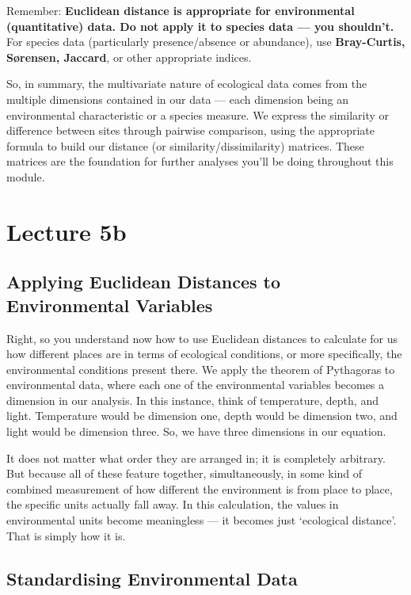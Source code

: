 \documentclass[
  12pt,
]{book}
\begin{document}
Remember: \textbf{Euclidean distance is appropriate for environmental
(quantitative) data. Do not apply it to species data --- you shouldn't.}
For species data (particularly presence/absence or abundance), use
\textbf{Bray-Curtis, Sørensen, Jaccard}, or other appropriate indices.

So, in summary, the multivariate nature of ecological data comes from
the multiple dimensions contained in our data --- each dimension being
an environmental characteristic or a species measure. We express the
similarity or difference between sites through pairwise comparison,
using the appropriate formula to build our distance (or
similarity/dissimilarity) matrices. These matrices are the foundation
for further analyses you'll be doing throughout this module.

\chapter*{Lecture 5b}\label{lecture-5b}

\section{Applying Euclidean Distances to Environmental
Variables}\label{applying-euclidean-distances-to-environmental-variables}

Right, so you understand now how to use Euclidean distances to calculate
for us how different places are in terms of ecological conditions, or
more specifically, the environmental conditions present there. We apply
the theorem of Pythagoras to environmental data, where each one of the
environmental variables becomes a dimension in our analysis. In this
instance, think of temperature, depth, and light. Temperature would be
dimension one, depth would be dimension two, and light would be
dimension three. So, we have three dimensions in our equation.

It does not matter what order they are arranged in; it is completely
arbitrary. But because all of these feature together, simultaneously, in
some kind of combined measurement of how different the environment is
from place to place, the specific units actually fall away. In this
calculation, the values in environmental units become meaningless --- it
becomes just `ecological distance'. That is simply how it is.

\section{Standardising Environmental
Data}\label{standardising-environmental-data}
\end{document}
